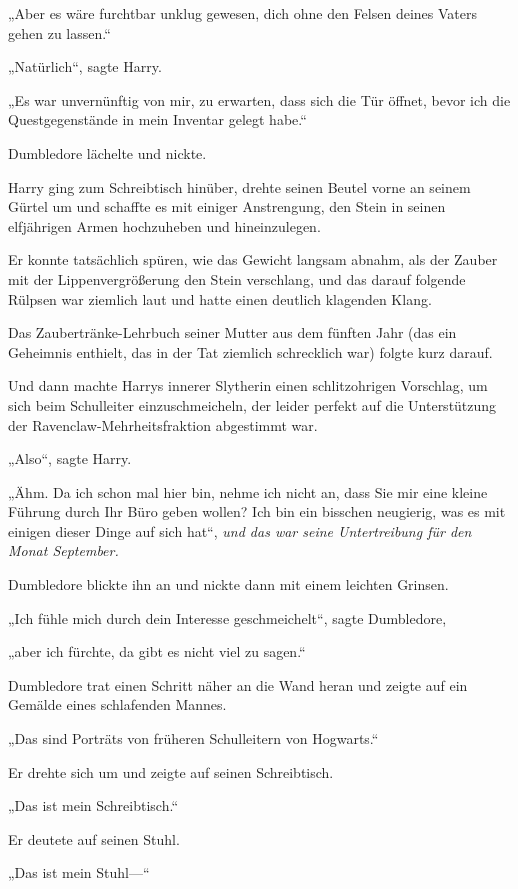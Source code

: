 {„Aber es wäre furchtbar unklug gewesen, dich ohne den Felsen deines Vaters gehen zu lassen.“

„Natürlich“, sagte Harry.

„Es war unvernünftig von mir, zu erwarten, dass sich die Tür öffnet, bevor ich die Questgegenstände in mein Inventar gelegt habe.“

Dumbledore lächelte und nickte.

Harry ging zum Schreibtisch hinüber, drehte seinen Beutel vorne an seinem Gürtel um und schaffte es mit einiger Anstrengung, den Stein in seinen elfjährigen Armen hochzuheben und hineinzulegen.

Er konnte tatsächlich spüren, wie das Gewicht langsam abnahm, als der Zauber mit der Lippenvergrößerung den Stein verschlang, und das darauf folgende Rülpsen war ziemlich laut und hatte einen deutlich klagenden Klang.

Das Zaubertränke-Lehrbuch seiner Mutter aus dem fünften Jahr (das ein Geheimnis enthielt, das in der Tat ziemlich schrecklich war) folgte kurz darauf.

Und dann machte Harrys innerer Slytherin einen schlitzohrigen Vorschlag, um sich beim Schulleiter einzuschmeicheln, der leider perfekt auf die Unterstützung der Ravenclaw-Mehrheitsfraktion abgestimmt war.

„Also“, sagte Harry.

„Ähm. Da ich schon mal hier bin, nehme ich nicht an, dass Sie mir eine kleine Führung durch Ihr Büro geben wollen? Ich bin ein bisschen neugierig, was es mit einigen dieser Dinge auf sich hat“, \emph{und das war seine Untertreibung für den Monat September.}

Dumbledore blickte ihn an und nickte dann mit einem leichten Grinsen.

„Ich fühle mich durch dein Interesse geschmeichelt“, sagte Dumbledore,

„aber ich fürchte, da gibt es nicht viel zu sagen.“

Dumbledore trat einen Schritt näher an die Wand heran und zeigte auf ein Gemälde eines schlafenden Mannes.

„Das sind Porträts von früheren Schulleitern von Hogwarts.“

Er drehte sich um und zeigte auf seinen Schreibtisch.

„Das ist mein Schreibtisch.“

Er deutete auf seinen Stuhl.

„Das ist mein Stuhl—“

}
